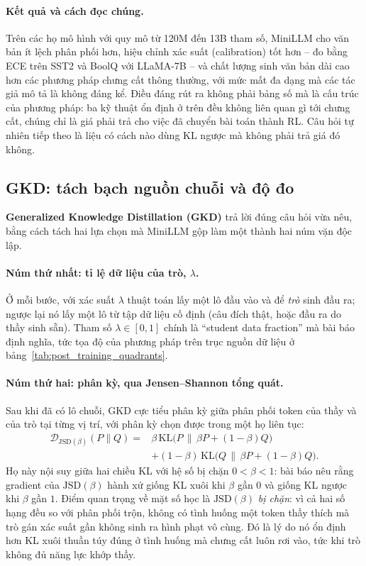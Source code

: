 \paragraph{Kết quả và cách đọc chúng.} Trên các họ mô hình với quy mô từ 120M đến 13B tham số, MiniLLM cho văn bản ít lệch phân phối hơn, hiệu chỉnh xác suất (calibration) tốt hơn -- đo bằng ECE trên SST2 và BoolQ với LLaMA-7B -- và chất lượng sinh văn bản dài cao hơn các phương pháp chưng cất thông thường, với mức mất đa dạng mà các tác giả mô tả là không đáng kể. Điều đáng rút ra không phải bảng số mà là cấu trúc của phương pháp: ba kỹ thuật ổn định ở trên đều không liên quan gì tới chưng cất, chúng chỉ là giá phải trả cho việc đã chuyển bài toán thành RL. Câu hỏi tự nhiên tiếp theo là liệu có cách nào dùng KL ngược mà không phải trả giá đó không.

\subsection{GKD: tách bạch nguồn chuỗi và độ đo}
\label{ssec:gkd}

\textbf{Generalized Knowledge Distillation (GKD)} \cite{agarwal2024gkd} trả lời đúng câu hỏi vừa nêu, bằng cách tách hai lựa chọn mà MiniLLM gộp làm một thành hai núm vặn độc lập.

\paragraph{Núm thứ nhất: tỉ lệ dữ liệu của trò, $\lambda$.} Ở mỗi bước, với xác suất $\lambda$ thuật toán lấy một lô đầu vào và để \emph{trò} sinh đầu ra; ngược lại nó lấy một lô từ tập dữ liệu cố định (câu đích thật, hoặc đầu ra do thầy sinh sẵn). Tham số $\lambda\in[0,1]$ chính là ``student data fraction'' mà bài báo định nghĩa, tức tọa độ của phương pháp trên trục nguồn dữ liệu ở bảng~\ref{tab:post_training_quadrants}.

\paragraph{Núm thứ hai: phân kỳ, qua Jensen--Shannon tổng quát.} Sau khi đã có lô chuỗi, GKD cực tiểu phân kỳ giữa phân phối token của thầy và của trò tại từng vị trí, với phân kỳ chọn được trong một họ liên tục:
\[
\begin{aligned}
\mathcal{D}_{\mathrm{JSD}(\beta)}(P\|Q) = {}& \beta\,\mathrm{KL}\big(P \,\big\|\, \beta P + (1-\beta)Q\big)\\
&+ (1-\beta)\,\mathrm{KL}\big(Q \,\big\|\, \beta P + (1-\beta)Q\big).
\end{aligned}
\]
Họ này nội suy giữa hai chiều KL với hệ số bị chặn $0<\beta<1$: bài báo nêu rằng gradient của $\mathrm{JSD}(\beta)$ hành xử giống KL xuôi khi $\beta$ gần $0$ và giống KL ngược khi $\beta$ gần $1$. Điểm quan trọng về mặt số học là $\mathrm{JSD}(\beta)$ \emph{bị chặn}: vì cả hai số hạng đều so với phân phối trộn, không có tình huống một token thầy thích mà trò gán xác suất gần không sinh ra hình phạt vô cùng. Đó là lý do nó ổn định hơn KL xuôi thuần túy đúng ở tình huống mà chưng cất luôn rơi vào, tức khi trò không đủ năng lực khớp thầy.

